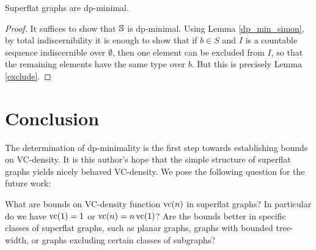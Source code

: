 \begin{Theorem} \label{flat_dp_thm}
  Superflat graphs are dp-minimal.
\end{Theorem}
\begin{proof}
  It suffices to show that $\mathbb S$ is dp-minimal.
  Using Lemma \ref{dp_min_simon}, by total indiscernibility
  it is enough to show that if $b \in S$ and $I$ is a countable sequence indiscernible over $\emptyset$,
  then one element can be excluded from $I$, so that the remaining elements have the same type over $b$.
  But this is precisely Lemma \ref{exclude}.
\end{proof}

\section{Conclusion}
The determination of dp-minimality is the first step towards establishing bounds on VC-density.
It is this author's hope that the simple structure of superflat graphs yields nicely behaved VC-density.
We pose the following question for the future work:
\begin{openq} 
  What are bounds on VC-density function $\operatorname{vc}(n)$ in superflat graphs?
  In particular do we have $\operatorname{vc}(1) = 1$ or $\operatorname{vc}(n) = n \operatorname{vc}(1)$?
  Are the bounds better in specific classes of superflat graphs,
  such as planar graphs, graphs with bounded tree-width, or graphs excluding certain classes of subgraphs?
\end{openq}
